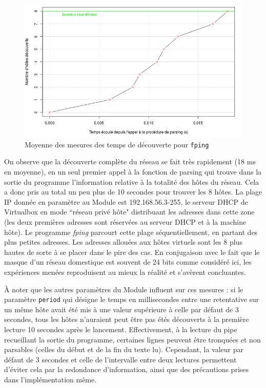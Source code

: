 \documentclass[]{article}
\begin{document}
\begin{figure}[!ht]
\centering
     \includegraphics[width=0.7\linewidth]{fpingmean}
     \caption{Moyenne des mesures des temps de découverte pour \texttt{fping}}
     \label{fpingmean}
\end{figure}

\vspace{0.1cm}

On observe que la découverte complète du réseau se fait très rapidement (18 ms en moyenne), en un seul premier appel à la fonction de parsing qui trouve dans la sortie du programme l'information relative à la totalité des hôtes du réseau. Cela a donc pris au total un peu plus de 10 secondes pour trouver les 8 hôtes. La plage IP donnée en paramètre au Module est 192.168.56.3-255, le serveur DHCP de Virtualbox en mode ``réseau privé hôte" distribuant les adresses dans cette zone (les deux premières adresses sont réservées au serveur DHCP et à la machine hôte). Le programme \textit{fping} parcourt cette plage séquentiellement, en partant des plus petites adresses. Les adresses allouées aux hôtes virtuels sont les 8 plus hautes de sorte à se placer dans le pire des cas. En conjugaison avec le fait que le masque d'un réseau domestique est souvent de 24 bits comme considéré ici, les expériences menées reproduisent au mieux la réalité et s'avèrent concluantes.\\ 

 \par À noter que les autres paramètres du Module influent sur ces mesures : si le paramètre \texttt{period} qui désigne le temps en millisecondes entre une retentative sur un même hôte avait été mis à une valeur supérieure à celle par défaut de 3 secondes, tous les hôtes n'auraient peut être pas étés découverts à la première lecture 10 secondes après le lancement. Effectivement, à la lecture du pipe recueillant la sortie du programme, certaines lignes peuvent être tronquées et non parsables (celles du début et de la fin du texte lu). Cependant, la valeur par défaut de 3 secondes et celle de l'intervalle entre deux lectures permettent d'éviter cela par la redondance d'information, ainsi que des précautions prises dans l'implémentation même.\\
\end{document}

